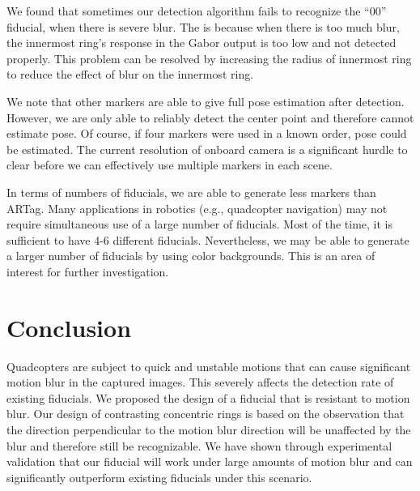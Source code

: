 \documentclass[10pt,twocolumn,letterpaper]{article}
\begin{document}
We found that sometimes our detection algorithm fails to recognize the
``00'' fiducial, when there is severe blur.  The is because when there
is too much blur, the innermost ring's response in the Gabor output is
too low and not detected properly.  This problem can be resolved by
increasing the radius of innermost ring to reduce the effect of blur
on the innermost ring.

We note that other markers are able to give full pose estimation after
detection.  However, we are only able to reliably detect the center
point and therefore cannot estimate pose.  Of course, if four markers
were used in a known order, pose could be estimated. The current
resolution of onboard camera is a significant  hurdle to clear before we
can effectively use multiple markers in each scene.

In terms of numbers of fiducials, we are able to generate less markers
than ARTag. Many applications in robotics (e.g., quadcopter navigation)
may not require simultaneous use of a large number of fiducials.  Most
of the time, it is sufficient to have 4-6 different
fiducials. Nevertheless, we may be able to generate a larger number of
fiducials by using color backgrounds. This is an area of interest for
further investigation.

\section{Conclusion}

Quadcopters are subject to quick and unstable motions that can cause
significant motion blur in the captured images. This severely affects
the detection rate of existing fiducials. We proposed the
design of a fiducial that is resistant to motion blur. Our design of
contrasting concentric rings is based on the observation that the
direction perpendicular to the motion blur direction will be
unaffected by the blur and therefore still be recognizable. We have
shown through experimental validation that our fiducial will work
under large amounts of motion blur and can significantly outperform
existing fiducials under this scenario.

{\small


}
\end{document}
